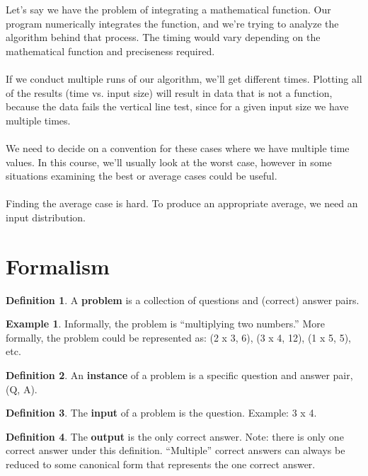 \documentclass[]{article}
\theoremstyle{definition}
\newtheorem*{defn}{Definition}
\newtheorem{ex}{Example}[section]
\newcommand{\lecture}[1]{\marginpar{{\footnotesize $\leftarrow$ \underline{#1}}}}
\begin{document}
			Let's say we have the problem of integrating a mathematical function. Our program numerically integrates the function, and we're trying to analyze the algorithm behind that process. The timing would vary depending on the mathematical function and preciseness required.
			\\ \\
			If we conduct multiple runs of our algorithm, we'll get different times. Plotting all of the results (time vs. input size) will result in data that is not a function, because the data fails the vertical line test, since for a given input size we have multiple times.
			\\ \\
			We need to decide on a convention for these cases where we have multiple time values. In this course, we'll usually look at the worst case, however in some situations examining the best or average cases could be useful.
			\\ \\
			Finding the average case is hard. To produce an appropriate average, we need an input distribution.
	\section{Formalism} \lecture{January 15, 2013}
		\begin{defn}
			A \textbf{problem} is a collection of questions and (correct) answer pairs.
		\end{defn}

		\begin{ex}
			Informally, the problem is ``multiplying two numbers.'' More formally, the problem could be represented as: (2 x 3, 6), (3 x 4, 12), (1 x 5, 5), etc.
		\end{ex}

		\begin{defn}
			An \textbf{instance} of a problem is a specific question and answer pair, (Q, A).
		\end{defn}

		\begin{defn}
			The \textbf{input} of a problem is the question. Example: 3 x 4.
		\end{defn}

		\begin{defn}
			The \textbf{output} is the only correct answer. Note: there is only one correct answer under this definition. ``Multiple'' correct answers can always be reduced to some canonical form that represents the one correct answer.
		\end{defn}
\end{document}
